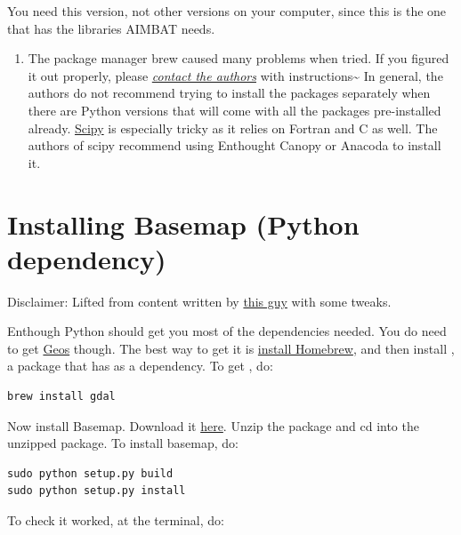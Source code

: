 \documentclass[letterpaper,10pt,english]{sphinxmanual}
\begin{document}
You need this version, not other versions on your computer, since this is the one that has the libraries AIMBAT needs.
\begin{enumerate}
\item {} 
The package manager brew caused many problems when tried. If you figured it out properly, please {\hyperref[docfiles/introduction:authors-contacts]{\emph{contact the authors}}} with instructions\textasciitilde{} In general, the authors do not recommend trying to install the packages separately when there are Python versions that will come with all the packages pre-installed already. \href{http://www.scipy.org/install.html}{Scipy} is especially tricky as it relies on Fortran and C as well. The authors of scipy recommend using Enthought Canopy or Anacoda to install it.

\end{enumerate}


\section{Installing Basemap (Python dependency)}
\label{docfiles/install_dependencies:installing-basemap-python-dependency}
Disclaimer: Lifted from content written by \href{http://blog.bluedackers.com/2012/11/13/installing-basemap-on-mac-os-x-mountain-lion/}{this guy} with some tweaks.

Enthough Python should get you most of the dependencies needed. You do need to get \href{http://trac.osgeo.org/geos/}{Geos} though. The best way to get it is \href{http://matthewcarriere.com/2013/08/05/how-to-install-and-use-homebrew/}{install Homebrew}, and then install , a package that has  as a dependency. To get , do:

\begin{Verbatim}[commandchars=\\\{\}]
brew install gdal
\end{Verbatim}

Now install Basemap. Download it \href{https://pypi.python.org/pypi/basemap}{here}. Unzip the package and cd into the unzipped package. To install basemap, do:

\begin{Verbatim}[commandchars=\\\{\}]
sudo python setup.py build
sudo python setup.py install
\end{Verbatim}

To check it worked, at the terminal, do:
\end{document}
